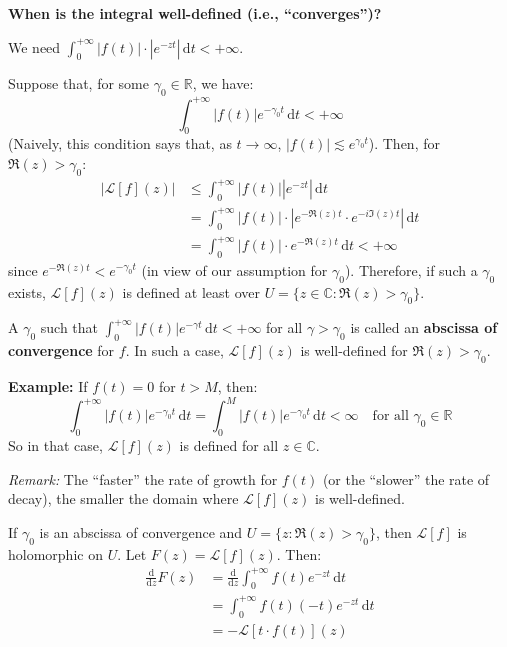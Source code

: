 \textbf{When is the integral well-defined (i.e., ``converges'')?}

We need $\int_0^{+\infty} |f(t)| \cdot |e^{-zt}| \,\mathrm{d}t < +\infty$.

Suppose that, for some $\gamma_0 \in \mathbb{R}$, we have:
\begin{equation*}
    \int_0^{+\infty} |f(t)| e^{-\gamma_0 t} \,\mathrm{d}t < +\infty
\end{equation*}
(Naively, this condition says that, as $t \to \infty$, $|f(t)| \lesssim e^{\gamma_0 t}$).
Then, for $\Re(z) > \gamma_0$:
\begin{align*}
    |\mathcal{L}[f](z)| &\le \int_0^{+\infty} |f(t)| |e^{-zt}| \,\mathrm{d}t \\
    &= \int_0^{+\infty} |f(t)| \cdot \left| e^{-\Re(z)t} \cdot e^{-i \Im(z)t} \right| \,\mathrm{d}t \\
    &= \int_0^{+\infty} |f(t)| \cdot e^{-\Re(z)t} \,\mathrm{d}t < +\infty
\end{align*}
since $e^{-\Re(z)t} < e^{-\gamma_0 t}$ (in view of our assumption for $\gamma_0$). Therefore, if such a $\gamma_0$ exists, $\mathcal{L}[f](z)$ is defined at least over $U = \{z \in \mathbb{C} : \Re(z) > \gamma_0\}$.

\begin{definition}
A $\gamma_0$ such that $\int_0^{+\infty} |f(t)| e^{-\gamma t} \,\mathrm{d}t < +\infty$ for all $\gamma > \gamma_0$ is called an \textbf{abscissa of convergence} for $f$. In such a case, $\mathcal{L}[f](z)$ is well-defined for $\Re(z) > \gamma_0$.
\end{definition}

\textbf{Example:} If $f(t) = 0$ for $t > M$, then:
\begin{equation*}
    \int_0^{+\infty} |f(t)| e^{-\gamma_0 t} \,\mathrm{d}t = \int_0^M |f(t)| e^{-\gamma_0 t} \,\mathrm{d}t < \infty \quad \text{for all } \gamma_0 \in \mathbb{R}
\end{equation*}
So in that case, $\mathcal{L}[f](z)$ is defined for all $z \in \mathbb{C}$.

\textit{Remark:} The ``faster'' the rate of growth for $f(t)$ (or the ``slower'' the rate of decay), the smaller the domain where $\mathcal{L}[f](z)$ is well-defined.

If $\gamma_0$ is an abscissa of convergence and $U = \{z : \Re(z) > \gamma_0\}$, then $\mathcal{L}[f]$ is holomorphic on $U$. 
Let $F(z) = \mathcal{L}[f](z)$. Then:
\begin{align*}
    \frac{\mathrm{d}}{\mathrm{d}z} F(z) &= \frac{\mathrm{d}}{\mathrm{d}z} \int_0^{+\infty} f(t) e^{-zt} \,\mathrm{d}t \\
    &= \int_0^{+\infty} f(t) (-t) e^{-zt} \,\mathrm{d}t \\
    &= -\mathcal{L}[t \cdot f(t)](z)
\end{align*}


